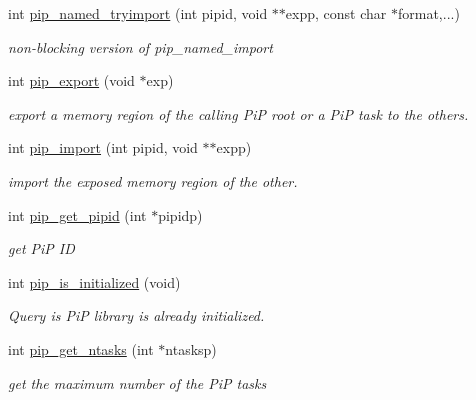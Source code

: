 \begin{DoxyCompactItemize}
\item 
int \hyperlink{group__libpip_gaa4b5ad0f8227ba1010648718dae04730}{pip\-\_\-named\-\_\-tryimport} (int pipid, void $\ast$$\ast$expp, const char $\ast$format,...)
\begin{DoxyCompactList}\small\item\em non-\/blocking version of {\ttfamily pip\-\_\-named\-\_\-import} \end{DoxyCompactList}\end{DoxyCompactItemize}
\begin{DoxyCompactItemize}
\item 
int \hyperlink{group__libpip_ga76ef9337bec7dd836168f22247d4c64c}{pip\-\_\-export} (void $\ast$exp)
\begin{DoxyCompactList}\small\item\em export a memory region of the calling Pi\-P root or a Pi\-P task to the others. \end{DoxyCompactList}\end{DoxyCompactItemize}
\begin{DoxyCompactItemize}
\item 
int \hyperlink{group__libpip_ga6d7ac596a9da824e40d7c06528f42e5f}{pip\-\_\-import} (int pipid, void $\ast$$\ast$expp)
\begin{DoxyCompactList}\small\item\em import the exposed memory region of the other. \end{DoxyCompactList}\end{DoxyCompactItemize}
\begin{DoxyCompactItemize}
\item 
int \hyperlink{group__libpip_ga4e715bb8c325e9acc81af0745908dc0e}{pip\-\_\-get\-\_\-pipid} (int $\ast$pipidp)
\begin{DoxyCompactList}\small\item\em get Pi\-P I\-D \end{DoxyCompactList}\end{DoxyCompactItemize}
\begin{DoxyCompactItemize}
\item 
int \hyperlink{group__libpip_gabbec4ae2f820b13400f63cba55a53399}{pip\-\_\-is\-\_\-initialized} (void)
\begin{DoxyCompactList}\small\item\em Query is Pi\-P library is already initialized. \end{DoxyCompactList}\item 
int \hyperlink{group__libpip_ga9786d5aafa2a3882714c35ecc9f39a5a}{pip\-\_\-get\-\_\-ntasks} (int $\ast$ntasksp)
\begin{DoxyCompactList}\small\item\em get the maximum number of the Pi\-P tasks \end{DoxyCompactList}\end{DoxyCompactItemize}
